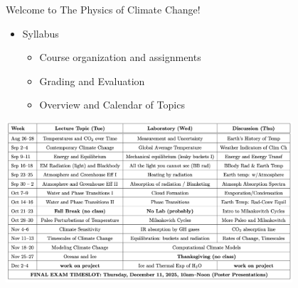 \documentclass[12pt]{beamer}
\title%
{}
\subtitle
{} %
\author%
{Ben Holder}%
\date%
{}
\begin{document}

\begin{frame}{Welcome to The Physics of Climate Change!}
	\begin{itemize}
	\addtolength{\itemsep}{0.5\baselineskip}
	\item Syllabus
		\begin{itemize}
		\item Course organization and assignments
		\item Grading and Evaluation
		\item Overview and Calendar of Topics
		\end{itemize}
	\end{itemize}

\begin{center}
\includegraphics[width=0.8\textwidth]{images/calendar-F2025}
\end{center}

\end{frame}
\end{document}
